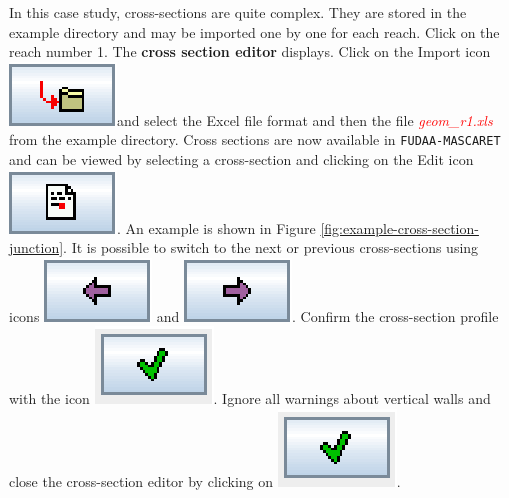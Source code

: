 \documentclass[a4paper,12pt]{article}
\begin{document}
\hspace{0.5cm}In this case study, cross-sections are quite complex. They
are stored in the example directory and may be imported one by one for
each reach. Click on the reach number 1. The \textbf{cross section
editor} displays. Click on the Import icon \includegraphics[scale=0.6]{import}and
select the Excel file format and then the file \textcolor{red}{\textit{geom\_r1.xls}}
from the example directory. Cross sections are now
available in \texttt{FUDAA-MASCARET} and can be viewed by
selecting a cross-section and clicking on the Edit icon \includegraphics[scale=0.6]{edit}. An example is shown in Figure \ref{fig:example-cross-section-junction}. It is possible to switch
to the next or previous cross-sections using icons \includegraphics[scale=0.6]{reculer}
and \includegraphics[scale=0.6]{avancer}.
Confirm the cross-section profile with the icon \includegraphics[scale=0.6]{valid}.
Ignore all warnings about vertical walls and close the cross-section
editor by clicking on \includegraphics[scale=0.6]{valid}.
\end{document}
